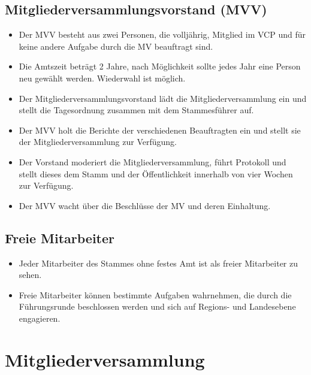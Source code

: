 \documentclass[a4paper]{article}
\begin{document}
    \subsection{Mitgliederversammlungsvorstand (MVV)} %
    \label{sub:mitgliederversammlungsvorstand_mvv}
	\begin{itemize}
		\item Der MVV besteht aus zwei Personen, die volljährig, Mitglied im VCP und für keine andere Aufgabe durch die MV beauftragt sind. 
		\item Die Amtszeit beträgt 2 Jahre, nach Möglichkeit sollte jedes Jahr eine Person neu gewählt werden. Wiederwahl ist möglich. 
		\item Der Mitgliederversammlungsvorstand lädt die Mitgliederversammlung ein und stellt die Tagesordnung zusammen mit dem Stammesführer auf. 
		\item Der MVV holt die Berichte der verschiedenen Beauftragten ein und stellt sie der Mitgliederversammlung zur Verfügung. 
		\item Der Vorstand moderiert die Mitgliederversammlung, führt Protokoll und stellt dieses dem Stamm und der Öffentlichkeit innerhalb von vier Wochen zur Verfügung. 
		\item Der MVV wacht über die Beschlüsse der MV und deren Einhaltung. 
	\end{itemize}
    
    \subsection{Freie Mitarbeiter} %
    \label{sub:freie_mitarbeiter}
	\begin{itemize}
		\item Jeder Mitarbeiter des Stammes ohne festes Amt ist als freier Mitarbeiter zu sehen. 
		\item Freie Mitarbeiter können bestimmte Aufgaben wahrnehmen, die durch die Führungsrunde beschlossen werden und sich auf Regions- und Landesebene engagieren. 
	\end{itemize}


\section{Mitgliederversammlung} %
\label{sec:mitgliederversammlung}
\end{document}
